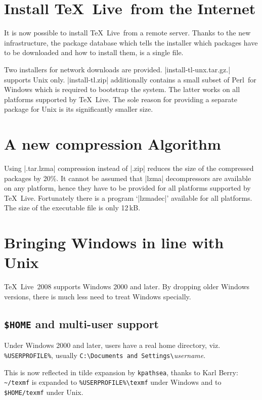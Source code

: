 \documentclass{ltugproc}
\newcommand{\tl}{\TeX~Live}
\newcommand{\pl}{Perl}
\newcommand{\kpse}{\texttt{kpathsea}}
\begin{document}
\section{Install \tl\ from the Internet}
\label{sec:internet}

It is now possible to install \tl\ from a remote server.  Thanks to
the new infrastructure, the package database which tells the
installer which packages have to be downloaded and how to install
them, is a single file.

Two installers for network downloads are provided.
|install-tl-unx.tar.gz.| supports Unix only.  |install-tl.zip|
additionally contains a small subset of \pl\ for Windows which is
required to bootstrap the system.  The latter works on all platforms
supported by \tl.  The sole reason for providing a separate package
for Unix is its significantly smaller size.


\section{A new compression Algorithm}
\label{sec:lzma}

Using |.tar.lzma| compression instead of |.zip| reduces the size of the
compressed packages by 20\%.  It cannot be assumed that |lzma|
decompressors are available on any platform, hence they have to be
provided for all platforms supported by \tl.  Fortunately there is a
program `|lzmadec|' available for all platforms.  The size of the
executable file is only 12\,kB.

\section{Bringing Windows in line with Unix}

\tl\ 2008 supports Windows 2000 and later. By dropping older Windows
versions, there is much less need to treat Windows specially.

\subsection{\texttt{\$HOME} and multi-user support}
Under Windows 2000 and later, users have a real home directory,
viz. \verb+%USERPROFILE%+, usually
\verb+C:\Documents and Settings\+\textit{username}.

This is now reflected in tilde expansion by \kpse, thanks to Karl
Berry: \verb+~/texmf+ is expanded to \verb+%USERPROFILE%\texmf+
under Windows and to \verb+$HOME/texmf+ under Unix.
\end{document}
